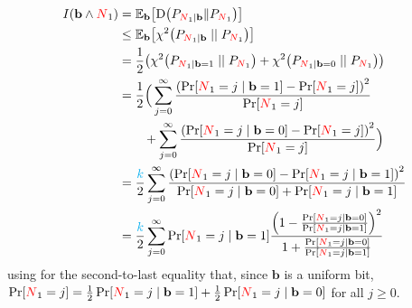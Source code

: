 \begin{align}
	\mutualinfo{\mathbf{b}}{\occur_1} 
	&= \bE{\mathbf{b}}{\kldiv{P_{\occur_1\mid \mathbf{b}}}{P_{\occur_1}}} \notag\\
	&\leq \bE{\mathbf{b}}{\chisquare{P_{\occur_1\mid \mathbf{b}}}{P_{\occur_1}}} \notag\\
	&= \frac{1}{2}\Paren{\chisquare{P_{\occur_1\mid \mathbf{b}=\accept}}{P_{\occur_1}} + \chisquare{P_{\occur_1\mid \mathbf{b}=\reject}}{P_{\occur_1}}}\notag\\
	&= \frac{1}{2}\Big(\sum_{j=0}^\infty \frac{\Paren{\bPr{\occur_1=j\mid \mathbf{b}=\accept }-\bPr{\occur_1=j }}^2}{\bPr{\occur_1=j}}  \notag\\
	&\qquad+ \sum_{j=0}^\infty \frac{\Paren{\bPr{\occur_1=j\mid \mathbf{b}=\reject }-\bPr{\occur_1=j }}^2}{\bPr{\occur_1=j}} \Big) \notag\\
	&=\frac{\ab}{2} \sum_{j=0}^\infty \frac{\Paren{\bPr{\occur_1=j\mid \mathbf{b}=\reject }-\bPr{\occur_1=j\mid \mathbf{b}=\accept }}^2}{\bPr{\occur_1=j\mid \mathbf{b}=\reject }+\bPr{\occur_1=j\mid \mathbf{b}=\accept }} \\
	&= \frac{\ab}{2} \sum_{j=0}^\infty \bPr{\occur_1=j\mid \mathbf{b}=\accept }\frac{ \Paren{1-  \frac{\bPr{\occur_1=j\mid \mathbf{b}=\reject }}{\bPr{\occur_1=j\mid \mathbf{b}=\accept }}  }^2}{1+\frac{\bPr{\occur_1=j\mid \mathbf{b}=\reject }}{\bPr{\occur_1=j\mid \mathbf{b}=\accept }}}  \notag
\end{align}
using for the second-to-last equality that, since $\mathbf{b}$ is a uniform bit, $\bPr{\occur_1=j} = \frac{1}{2}\bPr{\occur_1=j\mid \mathbf{b}=\accept }+\frac{1}{2}\bPr{\occur_1=j\mid \mathbf{b}=\reject }$ for all $j\geq 0$.\smallskip

